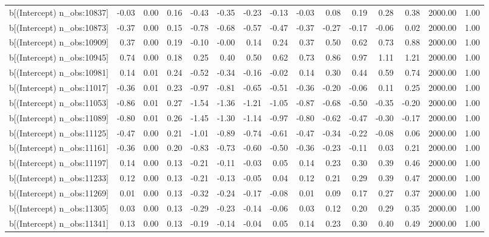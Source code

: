 \begin{table}[ht]
\begin{tabular}{rrrrrrrrrrrrrrr}
  b[(Intercept) n\_obs:10837] & -0.03 & 0.00 & 0.16 & -0.43 & -0.35 & -0.23 & -0.13 & -0.03 & 0.08 & 0.19 & 0.28 & 0.38 & 2000.00 & 1.00 \\ 
  b[(Intercept) n\_obs:10873] & -0.37 & 0.00 & 0.15 & -0.78 & -0.68 & -0.57 & -0.47 & -0.37 & -0.27 & -0.17 & -0.06 & 0.02 & 2000.00 & 1.00 \\ 
  b[(Intercept) n\_obs:10909] & 0.37 & 0.00 & 0.19 & -0.10 & -0.00 & 0.14 & 0.24 & 0.37 & 0.50 & 0.62 & 0.73 & 0.88 & 2000.00 & 1.00 \\ 
  b[(Intercept) n\_obs:10945] & 0.74 & 0.00 & 0.18 & 0.25 & 0.40 & 0.50 & 0.62 & 0.73 & 0.86 & 0.97 & 1.11 & 1.21 & 2000.00 & 1.00 \\ 
  b[(Intercept) n\_obs:10981] & 0.14 & 0.01 & 0.24 & -0.52 & -0.34 & -0.16 & -0.02 & 0.14 & 0.30 & 0.44 & 0.59 & 0.74 & 2000.00 & 1.00 \\ 
  b[(Intercept) n\_obs:11017] & -0.36 & 0.01 & 0.23 & -0.97 & -0.81 & -0.65 & -0.51 & -0.36 & -0.20 & -0.06 & 0.11 & 0.25 & 2000.00 & 1.00 \\ 
  b[(Intercept) n\_obs:11053] & -0.86 & 0.01 & 0.27 & -1.54 & -1.36 & -1.21 & -1.05 & -0.87 & -0.68 & -0.50 & -0.35 & -0.20 & 2000.00 & 1.00 \\ 
  b[(Intercept) n\_obs:11089] & -0.80 & 0.01 & 0.26 & -1.45 & -1.30 & -1.14 & -0.97 & -0.80 & -0.62 & -0.47 & -0.30 & -0.17 & 2000.00 & 1.00 \\ 
  b[(Intercept) n\_obs:11125] & -0.47 & 0.00 & 0.21 & -1.01 & -0.89 & -0.74 & -0.61 & -0.47 & -0.34 & -0.22 & -0.08 & 0.06 & 2000.00 & 1.00 \\ 
  b[(Intercept) n\_obs:11161] & -0.36 & 0.00 & 0.20 & -0.83 & -0.73 & -0.60 & -0.50 & -0.36 & -0.23 & -0.11 & 0.03 & 0.21 & 2000.00 & 1.00 \\ 
  b[(Intercept) n\_obs:11197] & 0.14 & 0.00 & 0.13 & -0.21 & -0.11 & -0.03 & 0.05 & 0.14 & 0.23 & 0.30 & 0.39 & 0.46 & 2000.00 & 1.00 \\ 
  b[(Intercept) n\_obs:11233] & 0.12 & 0.00 & 0.13 & -0.21 & -0.13 & -0.05 & 0.04 & 0.12 & 0.21 & 0.29 & 0.39 & 0.47 & 2000.00 & 1.00 \\ 
  b[(Intercept) n\_obs:11269] & 0.01 & 0.00 & 0.13 & -0.32 & -0.24 & -0.17 & -0.08 & 0.01 & 0.09 & 0.17 & 0.27 & 0.37 & 2000.00 & 1.00 \\ 
  b[(Intercept) n\_obs:11305] & 0.03 & 0.00 & 0.13 & -0.29 & -0.23 & -0.14 & -0.06 & 0.03 & 0.12 & 0.20 & 0.29 & 0.35 & 2000.00 & 1.00 \\ 
  b[(Intercept) n\_obs:11341] & 0.13 & 0.00 & 0.13 & -0.19 & -0.14 & -0.04 & 0.05 & 0.14 & 0.23 & 0.30 & 0.40 & 0.49 & 2000.00 & 1.00 \\ 

\end{tabular}
\end{table}
